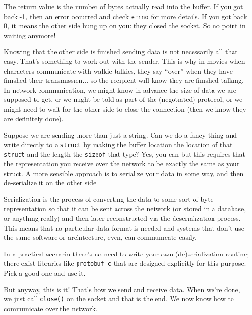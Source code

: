 The return value is the number of bytes actually read into the buffer. If you got back -1, then an error occurred and check \texttt{errno} for more details. If you got back 0, it means the other side hung up on you: they closed the socket. So no point in waiting anymore!

Knowing that the other side is finished sending data is not necessarily all that easy. That's something to work out with the sender. This is why in movies when characters communicate with walkie-talkies, they say ``over'' when they have finished their transmission... so the recipient will know they are finished talking. In network communication, we might know in advance the size of data we are supposed to get, or we might be told as part of the (negotiated) protocol, or we might need to wait for the other side to close the connection (then we know they are definitely done).

Suppose we are sending more than just a string. Can we do a fancy thing and write directly to a \texttt{struct} by making the buffer location the location of that \texttt{struct} and the length the \texttt{sizeof} that type? Yes, you can but this requires that the representation you receive over the network to be exactly the same as your struct. A more sensible approach is to serialize your data in some way, and then de-serialize it on the other side.

Serialization is the process of converting the data to some sort of byte-representation so that it can be sent across the network (or stored in a database, or anything really) and then later reconstructed via the deserialization process. This means that no particular data format is needed and systems that don't use the same software or architecture, even, can communicate easily.

In a practical scenario there's no need to write your own (de)serialization routine; there exist libraries like \texttt{protobuf-c} that are designed explicitly for this purpose. Pick a good one and use it.

But anyway, this is it! That's how we send and receive data. When we're done, we just call \texttt{close()} on the socket and that is the end. We now know how to communicate over the network.


